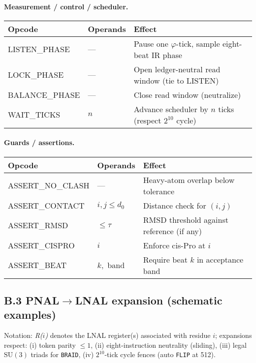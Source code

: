 \documentclass[12pt,a4paper]{article}
\begin{document}
\paragraph{Measurement / control / scheduler.}
\begin{center}
\renewcommand{\arraystretch}{1.1}
\begin{tabular}{@{}lll@{}}
\toprule
Opcode & Operands & Effect \\
\midrule
LISTEN\_PHASE & — & Pause one $\varphi$-tick, sample eight-beat IR phase \\
LOCK\_PHASE & — & Open ledger-neutral read window (tie to LISTEN) \\
BALANCE\_PHASE & — & Close read window (neutralize) \\
WAIT\_TICKS & $n$ & Advance scheduler by $n$ ticks (respect $2^{10}$ cycle) \\
\bottomrule
\end{tabular}
\end{center}

\paragraph{Guards / assertions.}
\begin{center}
\renewcommand{\arraystretch}{1.1}
\begin{tabular}{@{}lll@{}}
\toprule
Opcode & Operands & Effect \\
\midrule
ASSERT\_NO\_CLASH & — & Heavy-atom overlap below tolerance \\
ASSERT\_CONTACT & $i,j\le d_0$ & Distance check for $(i,j)$ \\
ASSERT\_RMSD & $\le\tau$ & RMSD threshold against reference (if any) \\
ASSERT\_CISPRO & $i$ & Enforce cis-Pro at $i$ \\
ASSERT\_BEAT & $k,$ band & Require beat $k$ in acceptance band \\
\bottomrule
\end{tabular}
\end{center}

\subsection*{B.3 PNAL$\to$LNAL expansion (schematic examples)}
Notation: \textit{R($i$)} denotes the LNAL register(s) associated with residue $i$; expansions respect:
(i) token parity $\le 1$,
(ii) eight-instruction neutrality (sliding),
(iii) legal $\mathrm{SU}(3)$ triads for \texttt{BRAID},
(iv) $2^{10}$-tick cycle fences (auto \texttt{FLIP} at 512).
\end{document}
